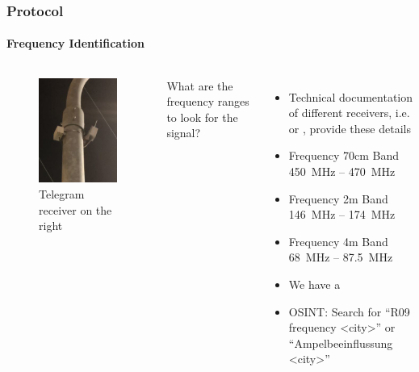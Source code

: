 \begin{frame}
\frametitle{Protocol}
\framesubtitle{Frequency Identification}
\begin{columns}
\centering
\begin{figure}
	\centering
	\includegraphics[width=\textwidth]{figs/lsa-antenna.png}
	\caption{Telegram receiver on the right}
\end{figure}
What are the frequency ranges to look for the signal?
\begin{itemize}
		\item Technical documentation of different receivers, i.e.  or , provide these details
		\item Frequency 70cm Band \SI{450}{\MHz} -- \SI{470}{\MHz}		
		\item Frequency 2m Band \SI{146}{\MHz} -- \SI{174}{\MHz}
		\item Frequency 4m Band \SI{68}{\MHz} -- \SI{87.5}{\MHz}
		\item We have a 
		\item OSINT: Search for ``R09 frequency <city>'' or ``Ampelbeeinflussung <city>''
\end{itemize}
\end{columns}
\end{frame}

